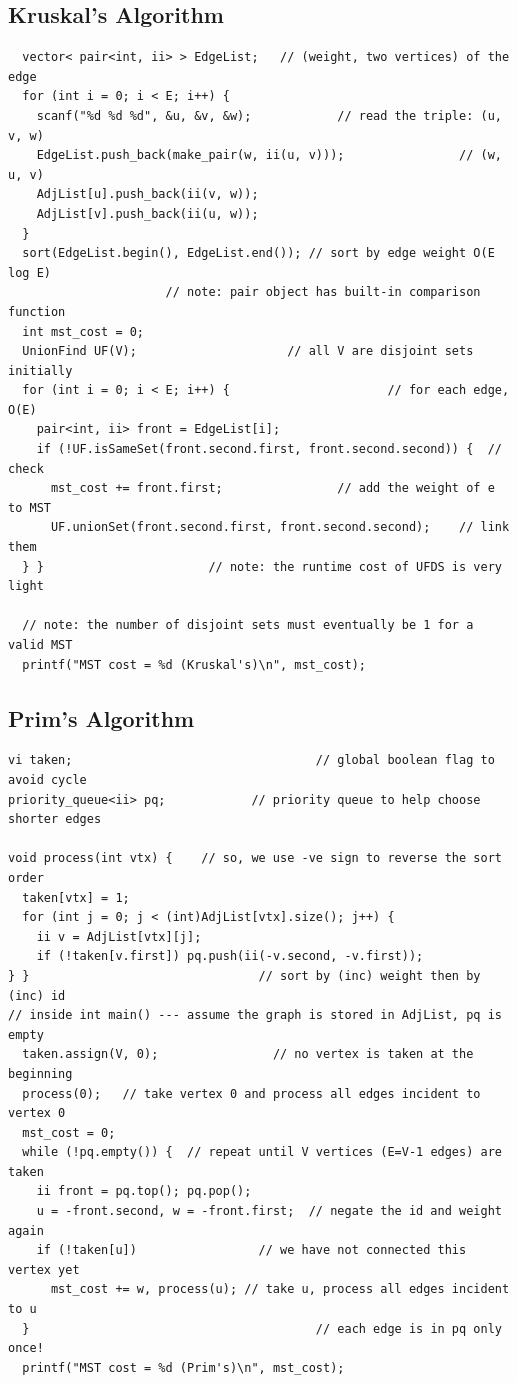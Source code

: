 \documentclass[10pt,landscape]{article}
\begin{document}
\begin{multicols}{2}
\subsection{Kruskal's Algorithm}
\begin{lstlisting}
  vector< pair<int, ii> > EdgeList;   // (weight, two vertices) of the edge
  for (int i = 0; i < E; i++) {
    scanf("%d %d %d", &u, &v, &w);            // read the triple: (u, v, w)
    EdgeList.push_back(make_pair(w, ii(u, v)));                // (w, u, v)
    AdjList[u].push_back(ii(v, w));
    AdjList[v].push_back(ii(u, w));
  }
  sort(EdgeList.begin(), EdgeList.end()); // sort by edge weight O(E log E)
                      // note: pair object has built-in comparison function
  int mst_cost = 0;
  UnionFind UF(V);                     // all V are disjoint sets initially
  for (int i = 0; i < E; i++) {                      // for each edge, O(E)
    pair<int, ii> front = EdgeList[i];
    if (!UF.isSameSet(front.second.first, front.second.second)) {  // check
      mst_cost += front.first;                // add the weight of e to MST
      UF.unionSet(front.second.first, front.second.second);    // link them
  } }                       // note: the runtime cost of UFDS is very light

  // note: the number of disjoint sets must eventually be 1 for a valid MST
  printf("MST cost = %d (Kruskal's)\n", mst_cost);
\end{lstlisting}

\subsection{Prim's Algorithm}
\begin{lstlisting}
vi taken;                                  // global boolean flag to avoid cycle
priority_queue<ii> pq;            // priority queue to help choose shorter edges

void process(int vtx) {    // so, we use -ve sign to reverse the sort order
  taken[vtx] = 1;
  for (int j = 0; j < (int)AdjList[vtx].size(); j++) {
    ii v = AdjList[vtx][j];
    if (!taken[v.first]) pq.push(ii(-v.second, -v.first));
} }                                // sort by (inc) weight then by (inc) id
// inside int main() --- assume the graph is stored in AdjList, pq is empty
  taken.assign(V, 0);                // no vertex is taken at the beginning
  process(0);   // take vertex 0 and process all edges incident to vertex 0
  mst_cost = 0;
  while (!pq.empty()) {  // repeat until V vertices (E=V-1 edges) are taken
    ii front = pq.top(); pq.pop();
    u = -front.second, w = -front.first;  // negate the id and weight again
    if (!taken[u])                 // we have not connected this vertex yet
      mst_cost += w, process(u); // take u, process all edges incident to u
  }                                        // each edge is in pq only once!
  printf("MST cost = %d (Prim's)\n", mst_cost);
\end{lstlisting}


\end{multicols}
\end{document}
